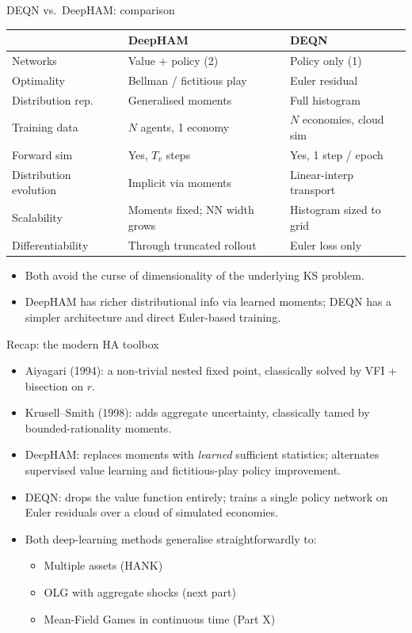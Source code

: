 \begin{frame}{DEQN vs.\ DeepHAM: comparison}
\begin{center}
\small
\begin{tabular}{lll}
\toprule
 & \textbf{DeepHAM} & \textbf{DEQN}\\
\midrule
Networks & Value $+$ policy (2) & Policy only (1)\\
Optimality & Bellman / fictitious play & Euler residual\\
Distribution rep.\ & Generalised moments & Full histogram\\
Training data & $N$ agents, 1 economy & $N$ economies, cloud sim\\
Forward sim & Yes, $T_v$ steps & Yes, 1 step / epoch\\
Distribution evolution & Implicit via moments & Linear-interp transport\\
Scalability & Moments fixed; NN width grows & Histogram sized to grid\\
Differentiability & Through truncated rollout & Euler loss only\\
\bottomrule
\end{tabular}
\end{center}
\medskip
\begin{itemize}
\item Both avoid the curse of dimensionality of the underlying KS problem.
\item DeepHAM has richer distributional info via learned moments; DEQN has a simpler architecture and direct Euler-based training.
\end{itemize}
\end{frame}

\begin{frame}{Recap: the modern HA toolbox}
\begin{itemize}
\item Aiyagari (1994): a non-trivial nested fixed point, classically solved by VFI + bisection on $r$.
\medskip
\item Krusell--Smith (1998): adds aggregate uncertainty, classically tamed by bounded-rationality moments.
\medskip
\item DeepHAM: replaces moments with \emph{learned} sufficient statistics; alternates supervised value learning and fictitious-play policy improvement.
\medskip
\item DEQN: drops the value function entirely; trains a single policy network on Euler residuals over a cloud of simulated economies.
\medskip
\item Both deep-learning methods generalise straightforwardly to:
  \begin{itemize}
  \item Multiple assets (HANK)
  \item OLG with aggregate shocks (next part)
  \item Mean-Field Games in continuous time (Part X)
  \end{itemize}
\end{itemize}
\end{frame}

